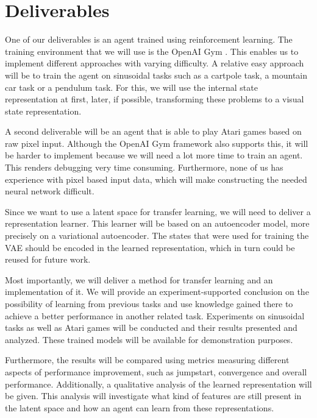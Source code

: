 \section{Deliverables}
\label{sec:deliverables}

One of our deliverables is an agent trained using reinforcement learning. The training environment that we will use is the OpenAI Gym \citep{openaigym}. This enables us to implement different approaches with varying difficulty. A relative easy approach will be to train the agent on sinusoidal tasks such as a cartpole task, a mountain car task or a pendulum task. For this, we will use the internal state representation at first, later, if possible, transforming these problems to a visual state representation. 

A second deliverable will be an agent that is able to play Atari games based on raw pixel input. Although the OpenAI Gym framework also supports this, it will be harder to implement because we will need a lot more time to train an agent. This renders debugging very time consuming. Furthermore, none of us has experience with pixel based input data, which will make constructing the needed neural network difficult.

Since we want to use a latent space for transfer learning, we will need to deliver a representation learner. This learner will be based on an autoencoder model, more precisely on a variational autoencoder. The states that were used for training the VAE should be encoded in the learned representation, which in turn could be reused for future work.

Most importantly, we will deliver a method for transfer learning and an implementation of it. 
We will provide an experiment-supported conclusion on the possibility of learning from previous tasks and use knowledge gained there to achieve a better performance in another related task. 
Experiments on sinusoidal tasks as well as Atari games will be conducted and their results presented and analyzed. These trained models will be available for demonstration purposes.

Furthermore, the results will be compared using metrics measuring different aspects of performance improvement, %
such as jumpstart, convergence and overall performance. Additionally, a qualitative analysis of the learned representation will be given. This analysis will investigate what kind of features are still present in the latent space and how an agent can learn from these representations.
